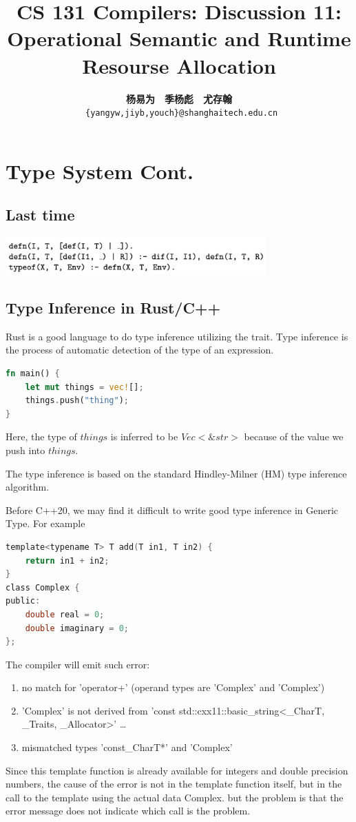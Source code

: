 \documentclass[a4paper]{article}
\title{CS 131 Compilers: Discussion 11: Operational Semantic and Runtime Resourse Allocation}
\author{\textbf{杨易为}~~\textbf{季杨彪}~~\textbf{尤存翰} \\ \texttt{ \{yangyw,jiyb,youch\}@shanghaitech.edu.cn}}
\theoremstyle{definition}
\begin{document}
\maketitle

\section{Type System Cont.}
\subsection{Last time}

\includegraphics[width=10cm]{img/Snipaste_2021-05-17_17-48-16.png}

\subsection{Type Inference in Rust/C++}
Rust is a good language to do type inference utilizing the trait. Type inference is the process of automatic detection of the type of an expression.

\begin{lstlisting}[language=Rust]
fn main() {
    let mut things = vec![];
    things.push("thing");
}
\end{lstlisting}
Here, the type of $things$ is inferred to be $Vec<\&str>$ because of the value we push into $things$.

The type inference is based on the standard Hindley-Milner (HM) type inference algorithm. 

Before C++20, we may find it difficult to write good type inference in Generic Type. For example

\begin{lstlisting}[language=C]
template<typename T> T add(T in1, T in2) {
    return in1 + in2;
}
class Complex {
public:
    double real = 0;
    double imaginary = 0;
};
\end{lstlisting}
The compiler will emit such error: 
\begin{enumerate}
  \item no match for 'operator+' (operand types are 'Complex' and 'Complex')
  \item 'Complex' is not derived from 'const std::cxx11::basic\_string<\_CharT, \_Traits, \_Allocator>' \dots
  \item mismatched types 'const\_CharT*' and 'Complex'
\end{enumerate}
Since this template function is already available for integers and double precision numbers, the cause of the error is not in the template function itself, but in the call to the template using the actual data Complex. but the problem is that the error message does not indicate which call is the problem.
\end{document}
